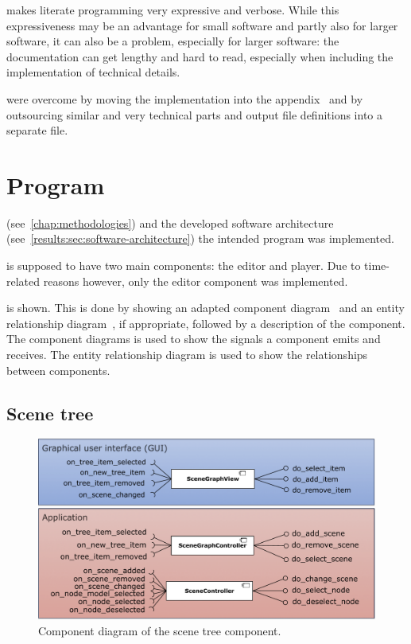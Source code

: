 \documentclass[%
    a4paper,    %
    justified,  %
    nobib,      %
    openany     %
]{tufte-book}
\begin{document}
 makes literate programming very
expressive and verbose. While this expressiveness may be an advantage for small
software and partly also for larger software, it can also be a problem,
especially for larger software: the documentation can get lengthy and hard to
read, especially when including the implementation of technical details.

 were overcome by moving the implementation into the
appendix~ and by outsourcing similar
and very technical parts and output file definitions into a separate
file.~

\section{Program}
\label{results:sec:program}

(see~\ref{chap:methodologies}) and the developed software architecture
(see~\ref{results:sec:software-architecture}) the intended program was
implemented.

 is supposed to have two main components:
the editor and player. Due to time-related reasons however, only the editor
component was implemented.

 is shown. This is done by
showing an adapted component diagram~\cite[pp. 653 -- 654]{larman-applying-2004}
and an entity relationship diagram~\cite[pp. 501 ff.]{larman-applying-2004}, if
appropriate, followed by a description of the component. The component diagrams
is used to show the signals a component emits and receives. The entity
relationship diagram is used to show the relationships between components.

\subsection{Scene tree}
\label{results:subsec:program:scene-tree}

\begin{figure}[ht]
  \caption{Component diagram of the scene tree component.}
  \label{fig:scene-graph-component-diagram}
  \includegraphics[width=0.95\linewidth]{images/scene-graph-component-diagram}
\end{figure}
\end{document}
